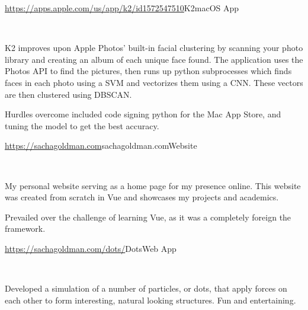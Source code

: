 \documentclass[]{style}
\begin{document}
\begin{entrylist}


\vspace{2mm}

\entry
{\url{https://apps.apple.com/us/app/k2/id1572547510}{K2}}{macOS App}
{ ~ \vspace{-2.5mm}

   

K2 improves upon Apple Photos' built-in facial clustering by scanning your photo library and creating an album of each unique face found. The application uses the Photos API to find the pictures, then runs up python subprocesses which finds faces in each photo using a SVM and vectorizes them using a CNN. These vectors are then clustered using DBSCAN.
\vspace{1mm}

Hurdles overcome included code signing python for the Mac App Store, and tuning the model to get the best accuracy.}


\vspace{2mm}

\entry
{\url{https://sachagoldman.com}{sachagoldman.com}}{Website}
{ ~ \vspace{-2.5mm}

 

My personal website serving as a home page for my presence online. This website was created from scratch in Vue and showcases my projects and academics. 
\vspace{1mm}

Prevailed over the challenge of learning Vue, as it was a completely foreign the framework.}



\entry
{\url{https://sachagoldman.com/dots/}{Dots}}{Web App}
{ ~ \vspace{-2.5mm}


Developed a simulation of a number of particles, or dots, that apply forces on each other to form interesting, natural looking structures. Fun and entertaining.}


\end{entrylist}
\end{document}
